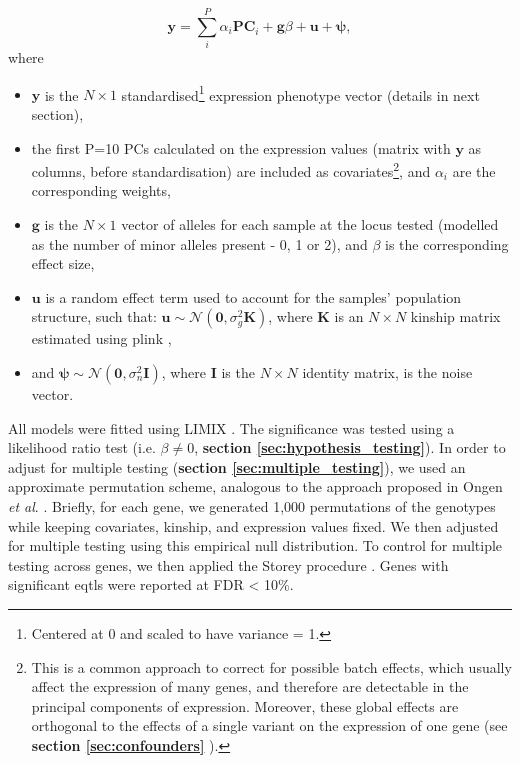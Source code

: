 \begin{equation}\label{eq:LMM_ipsc_eqtl}
    \mathbf{y} = \sum_i^{P}\alpha_i \mathbf{PC}_i + \mathbf{g}\beta + \mathbf{u} + \boldsymbol{\psi},  
\end{equation}
where 
\begin{itemize}
    \item $\mathbf{y}$ is the $N \times 1$ standardised\footnote{Centered at 0 and scaled to have variance = 1.} expression phenotype vector (details in next section),
    \item the first P=10 PCs calculated on the expression values (matrix with $\mathbf{y}$ as columns, before standardisation) are included as covariates\footnote{This is a common approach to correct for possible batch effects, which usually affect the expression of many genes, and therefore are detectable in the principal components of expression. 
    Moreover, these global effects are orthogonal to the effects of a single variant on the expression of one gene (see \textbf{section 
    \ref{sec:confounders}
    }).}, and $\alpha_i$ are the corresponding weights,
    \item $\mathbf{g}$ is the $N \times 1$ vector of alleles for each sample at the locus tested (modelled as the number of minor alleles present - 0, 1 or 2), and $\beta$ is the corresponding effect size,
    \item $\mathbf{u}$ is a random effect term used to account for the samples' population structure, such that: $\mathbf{u} \sim \mathcal{N}(\mathbf{0}, \sigma_g^2\mathbf{K})$, where $\mathbf{K}$ is an $N \times N$ kinship matrix estimated using plink \cite{purcell2007plink},
    \item and $\boldsymbol{\psi} \sim \mathcal{N}(\mathbf{0}, \sigma_n^2\mathbf{I})$, where $\mathbf{I}$ is the $N \times N$ identity matrix, is the noise vector.
\end{itemize}

\vspace{1.5mm}

\newpage

All models were fitted using LIMIX \cite{lippert2014limix, casale2015efficient}. 
The significance was tested using a likelihood ratio test (i.e. $\beta \neq 0$, \textbf{section 
\ref{sec:hypothesis_testing}}).
In order to adjust for multiple testing (\textbf{section
\ref{sec:multiple_testing}}),
we used an approximate permutation scheme, analogous to the approach proposed in Ongen \textit{et al}. \cite{ongen2016fast}. 
Briefly, for each gene, we generated 1,000 permutations of the genotypes while keeping covariates, kinship, and expression values fixed. 
We then adjusted for multiple testing using this empirical null distribution.
To control for multiple testing across genes, we then applied the Storey procedure \cite{storey2003statistical}. 
Genes with significant \glspl{eqtl} were reported at FDR < 10\%.

